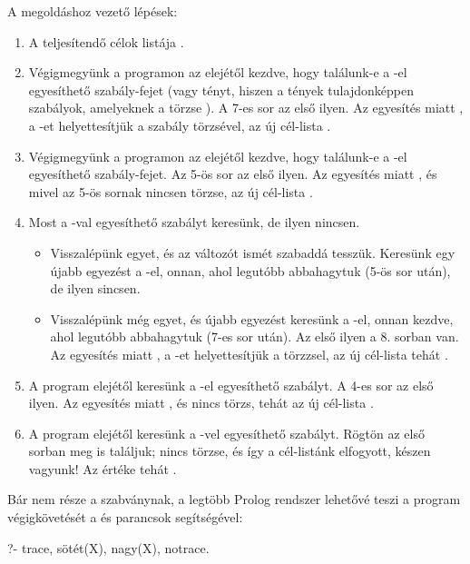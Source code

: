 A megoldáshoz vezető lépések:
\begin{enumerate}
\item A teljesítendő célok listája .
\item Végigmegyünk a programon az elejétől kezdve,
  hogy találunk-e a -el egyesíthető
  szabály-fejet (vagy tényt, hiszen a tények
  tulajdonképpen szabályok, amelyeknek a törzse
  ). A 7-es sor az első ilyen. Az egyesítés
  miatt , a -et
  helyettesítjük a szabály törzsével, az új
  cél-lista .
\item Végigmegyünk a programon az elejétől kezdve,
  hogy találunk-e a -el egyesíthető
  szabály-fejet. Az 5-ös sor az első ilyen. Az
  egyesítés miatt , és mivel az 5-ös
  sornak nincsen törzse, az új cél-lista
  .
\item Most a -val egyesíthető szabályt keresünk, de ilyen nincsen.
  \begin{itemize}
    \item Visszalépünk egyet, és az  változót
      ismét szabaddá tesszük. Keresünk egy újabb
      egyezést a -el, onnan, ahol
      legutóbb abbahagytuk (5-ös sor után), de ilyen
      sincsen.
    \item Visszalépünk még egyet, és újabb egyezést
      keresünk a -el, onnan kezdve,
      ahol legutóbb abbahagytuk (7-es sor után). Az
      első ilyen a 8. sorban van. Az egyesítés miatt
      , a -et helyettesítjük
      a törzzsel, az új cél-lista tehát
      .
  \end{itemize}
\item A program elejétől keresünk a -el
  egyesíthető szabályt. A 4-es sor az első ilyen. Az
  egyesítés miatt , és nincs törzs,
  tehát az új cél-lista .
\item A program elejétől keresünk a
  -vel egyesíthető szabályt. Rögtön
  az első sorban meg is találjuk; nincs törzse, és
  így a cél-listánk elfogyott, készen vagyunk! Az
   értéke tehát .
\end{enumerate}

Bár nem része a szabványnak, a legtöbb Prolog
rendszer lehetővé teszi a program végigkövetését a
 és  parancsok segítségével:
\begin{query}
?- trace, sötét(X), nagy(X), notrace.
\end{query}

